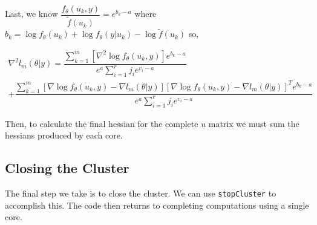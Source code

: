 \documentclass{article}
\begin{document}
Last, we know $\dfrac{f_\theta(u_k, y)}{\tilde{f}(u_k)} = e^{b_k -a}$ where $b_k = \log f_\theta (u_k) + \log f_\theta (y|u_k) - \log  \tilde{f} (u_k)$ so, 

\begin{multline}
\nabla^2 l_m(\theta|y)= \dfrac{   \sum_{k=1}^m \left[ \nabla^2 \log f_\theta(u_k,y)     \right]  e^{b_k-a}  }{e^a \sum_{i=1}^r j_i e^{v_i - a}}\\
+ \dfrac{   \sum_{k=1}^m \left[ \nabla \log f_\theta(u_k,y)  - \nabla l_m(\theta|y)   \right] \left[ \nabla \log f_\theta(u_k,y)  -\nabla l_m(\theta|y)  \right]^T  e^{b_k-a}}{e^a \sum_{i=1}^r j_i e^{v_i - a}}
\end{multline}

Then, to calculate the final hessian for the complete $u$ matrix we must sum the hessians produced by each core. 

\subsection{Closing the Cluster}
The final step we take is to close the cluster. We can use \texttt{stopCluster} to accomplish this. The code then returns to completing computations using a single core. 
\end{document}
